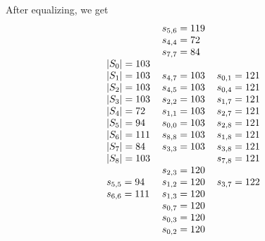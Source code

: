 \documentclass[letterpaper]{article}
\theoremstyle{definition}
\begin{document}
After equalizing, we get 
\[
\arraycolsep=3.0pt
\begin{array}[t]{lllll}
 \begin{array}{l}
|S_0| = 103 \\
|S_1| = 103 \\
|S_2| = 103 \\
|S_3| = 103 \\
|S_4| = 72 \\
|S_5| = 94 \\
|S_6| = 111 \\
|S_7| = 84 \\
|S_8| = 103 \\
\\
s_{5, 5} = 94 \\
s_{6, 6} = 111 \\
\end{array}
 &
\begin{array}{l}
s_{5, 6} = 119 \\
s_{4, 4} = 72 \\
s_{7, 7} = 84 \\
\\
s_{4, 7} = 103 \\
s_{4, 5} = 103 \\
s_{2, 2} = 103 \\
s_{1, 1} = 103 \\
s_{0, 0} = 103 \\
s_{8, 8} = 103 \\
s_{3, 3} = 103 \\
\\
s_{2, 3} = 120 \\
s_{1, 2} = 120 \\
s_{1, 3} = 120 \\
s_{0, 7} = 120 \\
s_{0, 3} = 120 \\
s_{0, 2} = 120 \\
 \end{array}
&
  \begin{array}{l}
s_{0, 1} = 121 \\
s_{0, 4} = 121 \\
s_{1, 7} = 121 \\
s_{2, 7} = 121 \\
s_{2, 8} = 121 \\
s_{1, 8} = 121 \\
s_{3, 8} = 121 \\
s_{7, 8} = 121 \\
\\
s_{3, 7} = 122 \\

\end{array}
\end{array}\]
\end{document}
